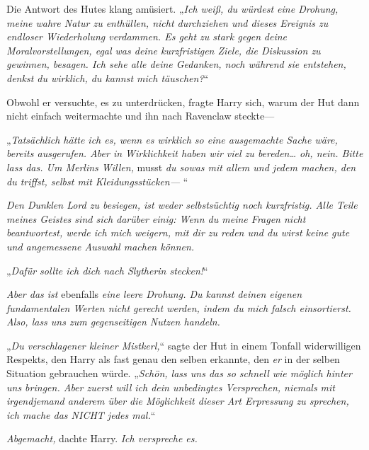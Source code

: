 {Die Antwort des Hutes klang amüsiert. „\emph{Ich weiß, du würdest eine Drohung, meine wahre Natur zu enthüllen, nicht durchziehen und dieses Ereignis zu endloser Wiederholung verdammen. Es geht zu stark gegen} \emph{deine Moralvorstellungen, egal was deine kurzfristigen Ziele, die Diskussion zu gewinnen, besagen. Ich sehe alle deine Gedanken, noch während sie entstehen, denkst du wirklich, du kannst mich täuschen?}“

Obwohl er versuchte, es zu unterdrücken, fragte Harry sich, warum der Hut dann nicht einfach weitermachte und ihn nach Ravenclaw steckte—

„\emph{Tatsächlich hätte ich es, wenn es wirklich so eine ausgemachte Sache wäre, bereits ausgerufen. Aber in Wirklichkeit haben wir viel zu bereden… oh, nein. Bitte lass das. Um Merlins Willen,} musst \emph{du sowas mit allem und jedem machen, den du triffst, selbst mit Kleidungsstücken—} “

\emph{Den Dunklen Lord zu besiegen, ist weder selbstsüchtig noch kurzfristig. Alle Teile meines Geistes sind sich darüber einig: Wenn du meine Fragen nicht beantwortest, werde ich mich weigern, mit dir zu reden und du wirst keine gute und angemessene Auswahl machen können.}

„\emph{Dafür sollte ich dich nach Slytherin stecken!}“

\emph{Aber das ist} ebenfalls \emph{eine leere Drohung. Du kannst deinen eigenen fundamentalen Werten nicht gerecht werden, indem du mich falsch einsortierst. Also, lass uns zum gegenseitigen Nutzen handeln.}

„\emph{Du verschlagener kleiner Mistkerl,}“ sagte der Hut in einem Tonfall widerwilligen Respekts, den Harry als fast genau den selben erkannte, den \emph{er} in der selben Situation gebrauchen würde. „\emph{Schön, lass uns das so schnell wie möglich hinter uns bringen. Aber zuerst will ich dein unbedingtes Versprechen, niemals mit irgendjemand anderem über die Möglichkeit dieser Art Erpressung zu sprechen, ich mache das NICHT jedes mal.}“

\emph{Abgemacht,} dachte Harry. \emph{Ich verspreche es.}

}
